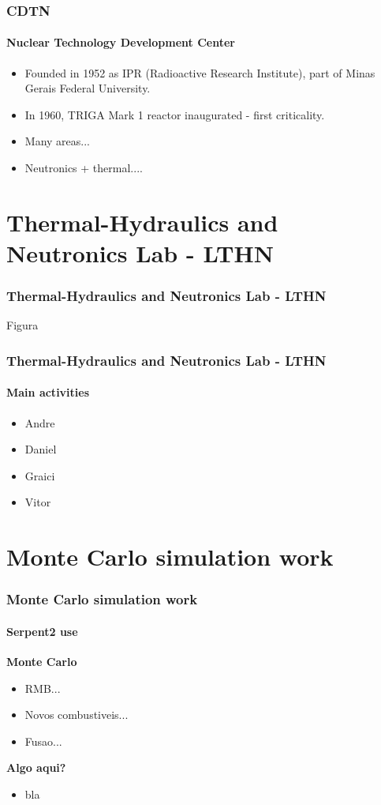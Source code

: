 \documentclass[svgnames,smaller,table]{beamer}
\begin{document}
\begin{frame}
  \frametitle{CDTN}
  \framesubtitle{Nuclear Technology Development Center}
  \begin{itemize}
  \item Founded in 1952 as IPR (Radioactive Research Institute), part of
    Minas Gerais Federal University.
  \item In 1960, TRIGA Mark 1 reactor inaugurated - first criticality.
  \item Many areas...
    \item Neutronics + thermal....
  \end{itemize}
\end{frame}


\section{Thermal-Hydraulics and Neutronics Lab - LTHN}
\begin{frame}
  \frametitle{Thermal-Hydraulics and Neutronics Lab - LTHN}
  \begin{center}
    Figura
  \end{center}
\end{frame}

\begin{frame}
  \frametitle{Thermal-Hydraulics and Neutronics Lab - LTHN}
  \framesubtitle{Main activities}
  \begin{center}
    \begin{itemize}
    \item Andre
    \item Daniel
    \item Graici
    \item Vitor
    \end{itemize}
  \end{center}
\end{frame}

\section{Monte Carlo simulation work}
\begin{frame}
  \frametitle{Monte Carlo simulation work}
  \framesubtitle{Serpent2 use}
  \textbf{Monte Carlo}
    \begin{itemize}
    \item RMB...
    \item Novos combustiveis...
    \item Fusao...
    \end{itemize}
    \vspace{10px}
  \textbf{Algo aqui?}
    \begin{itemize}
    \item bla
    \end{itemize}
\end{frame}
\end{document}
